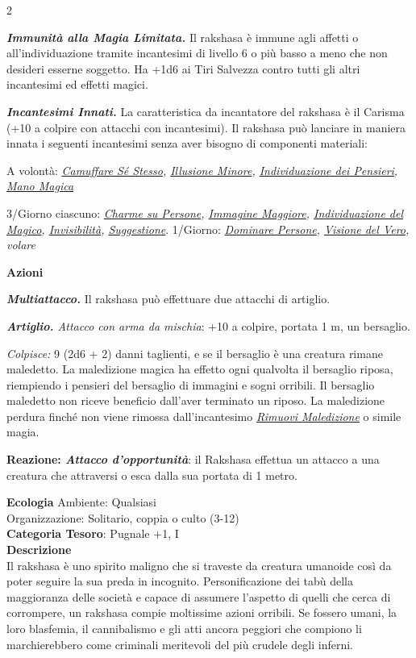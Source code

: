 \begin{multicols}{2}
{\emph{\textbf{Immunità alla Magia Limitata.}} Il rakshasa è immune agli affetti o all'individuazione tramite incantesimi di livello 6 o più basso a meno che non desideri esserne soggetto. Ha +1d6 ai Tiri Salvezza contro tutti gli altri incantesimi ed effetti magici.

\emph{\textbf{Incantesimi Innati.}} La caratteristica da incantatore del rakshasa è il Carisma (+10 a colpire con attacchi con incantesimi). Il rakshasa può lanciare in maniera innata i seguenti incantesimi senza aver bisogno di componenti materiali:

A volontà: \emph{\hyperlink{Camuffare Sé Stesso}{Camuffare Sé Stesso}, \hyperlink{Illusione Minore}{Illusione Minore}, \hyperlink{Individuazione dei Pensieri}{Individuazione dei Pensieri}, \hyperlink{Mano Magica}{Mano Magica}}

3/Giorno ciascuno: \emph{\hyperlink{Charme su Persone}{Charme su Persone}, \hyperlink{Immagine Maggiore}{Immagine Maggiore}, \hyperlink{Individuazione del Magico}{Individuazione del Magico}, \hyperlink{Invisibilità}{Invisibilità}, \hyperlink{Suggestione}{Suggestione}}. 1/Giorno: \emph{\hyperlink{Dominare Persone}{Dominare Persone}, \hyperlink{Visione del Vero}{Visione del Vero}, volare}

\textbf{Azioni}

\emph{\textbf{Multiattacco.}} Il rakshasa può effettuare due attacchi di artiglio.

\emph{\textbf{Artiglio.} Attacco con arma da mischia}: +10 a colpire, portata 1 m, un bersaglio.

\emph{Colpisce:} 9 (2d6 + 2) danni taglienti, e se il bersaglio è una creatura rimane maledetto. La maledizione magica ha effetto ogni qualvolta il bersaglio riposa, riempiendo i pensieri del bersaglio di immagini e sogni orribili. Il bersaglio maledetto non riceve beneficio dall'aver terminato un riposo. La maledizione perdura finché non viene rimossa dall'incantesimo \emph{\hyperlink{Rimuovi Maledizione}{Rimuovi Maledizione}} o simile magia.

\textbf{Reazione: \emph{Attacco d'opportunità}}: il Rakshasa effettua un attacco a una creatura che attraversi o esca dalla sua portata di 1 metro.

\textbf{Ecologia}
Ambiente: Qualsiasi\\
Organizzazione: Solitario, coppia o culto (3-12)\\
\textbf{Categoria Tesoro}: Pugnale +1, I\\
\textbf{Descrizione}\\
Il rakshasa è uno spirito maligno che si traveste da creatura umanoide così da poter seguire la sua preda in incognito. Personificazione dei tabù della maggioranza delle società e capace di assumere l'aspetto di quelli che cerca di corrompere, un rakshasa compie moltissime azioni orribili. Se fossero umani, la loro blasfemia, il cannibalismo e gli atti ancora peggiori che compiono li marchierebbero come criminali meritevoli del più crudele degli inferni.

}
\end{multicols}
